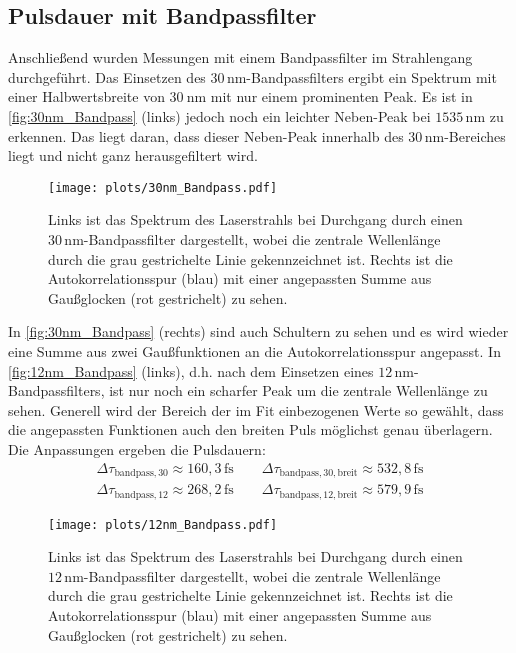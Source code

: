 \subsection{Pulsdauer mit Bandpassfilter}
    Anschließend wurden Messungen mit einem Bandpassfilter im Strahlengang durchgeführt.
    Das Einsetzen des $30\,\si{\nano\meter}$-Bandpassfilters ergibt ein Spektrum mit einer Halbwertsbreite von $\qty{30}{\nano\meter}$ mit nur einem prominenten Peak.
    Es ist in \autoref{fig:30nm_Bandpass} (links) jedoch noch ein leichter Neben-Peak bei $1535\,\si{\nano\meter}$ zu erkennen.
    Das liegt daran, dass dieser Neben-Peak innerhalb des $30\,\si{\nano\meter}$-Bereiches liegt und nicht ganz herausgefiltert wird.    
    \vspace*{-0.3cm}
    \begin{figure}[ht]
        \centering\captionsetup{format=plain}
        \texttt{[image: plots/30nm\_Bandpass.pdf]} \vspace*{-0.5cm}
        \caption{Links ist das Spektrum des Laserstrahls bei Durchgang durch einen $30\,\si{\nano\meter}$-Bandpassfilter dargestellt, wobei die zentrale Wellenlänge durch die grau gestrichelte Linie gekennzeichnet ist. Rechts ist die Autokorrelationsspur (blau) mit einer angepassten Summe aus Gaußglocken (rot gestrichelt) zu sehen.}
        \label{fig:30nm_Bandpass}
    \end{figure}
    \FloatBarrier
    In \autoref{fig:30nm_Bandpass} (rechts) sind auch Schultern zu sehen und es wird wieder eine Summe aus zwei Gaußfunktionen an die Autokorrelationsspur angepasst.
    In \autoref{fig:12nm_Bandpass} (links), d.h. nach dem Einsetzen eines $12\,\si{\nano\meter}$-Bandpassfilters, ist nur noch ein scharfer Peak um die zentrale Wellenlänge zu sehen.
    Generell wird der Bereich der im Fit einbezogenen Werte so gewählt, dass die angepassten Funktionen auch den breiten Puls möglichst genau überlagern.
    Die Anpassungen ergeben die Pulsdauern:
    \begin{align*}
        \Delta \tau_{\mathrm{bandpass,30}} \approx 160,3\,\si{\femto\second} \qquad \Delta \tau_{\mathrm{bandpass,30,breit}} \approx 532,8\,\si{\femto\second} \\
        \Delta \tau_{\mathrm{bandpass,12}} \approx 268,2\,\si{\femto\second} \qquad \Delta \tau_{\mathrm{bandpass,12,breit}} \approx 579,9\,\si{\femto\second}
    \end{align*}
    \begin{figure}[ht]
        \centering\captionsetup{format=plain}\vspace*{-1cm}
        \texttt{[image: plots/12nm\_Bandpass.pdf]} \vspace*{-0.5cm}
        \caption{Links ist das Spektrum des Laserstrahls bei Durchgang durch einen $12\,\si{\nano\meter}$-Bandpassfilter dargestellt, wobei die zentrale Wellenlänge durch die grau gestrichelte Linie gekennzeichnet ist. Rechts ist die Autokorrelationsspur (blau) mit einer angepassten Summe aus Gaußglocken (rot gestrichelt) zu sehen.}
        \label{fig:12nm_Bandpass}
    \end{figure}
    \FloatBarrier

